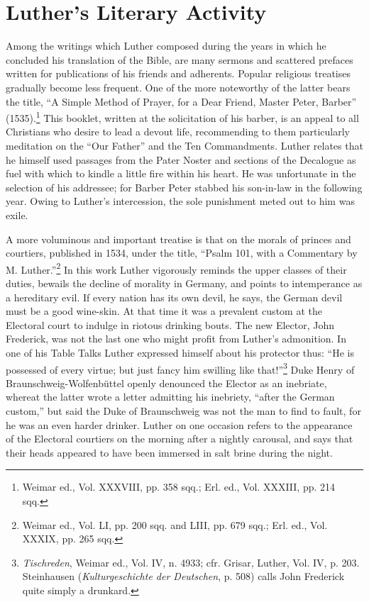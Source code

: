 \section{Luther’s Literary Activity}

Among the writings which Luther composed during the years in
which he concluded his translation of the Bible, are many sermons
and scattered prefaces written for publications of his friends and
adherents. Popular religious treatises gradually become less frequent.
One of the more noteworthy of the latter bears the title, “A Simple Method
of Prayer, for a Dear Friend, Master Peter, Barber”
(1535).\footnote{Weimar ed., Vol. XXXVIII, pp. 358 sqq.; Erl. ed., Vol. XXXIII, pp. 214 sqq.}
 This booklet, written at the solicitation of his barber, is an
appeal to all Christians who desire to lead a devout life, recommending
to them particularly meditation on the “Our Father” and the Ten
Commandments. Luther relates that he himself used passages from the
Pater Noster and sections of the Decalogue as fuel with which to
kindle a little fire within his heart. He was unfortunate in the selection
of his addressee; for Barber Peter stabbed his son-in-law in the
following year. Owing to Luther’s intercession, the sole punishment
meted out to him was exile.

A more voluminous and important treatise is that on the morals of
princes and courtiers, published in 1534, under the title, “Psalm 101,
with a Commentary by M. Luther.”\footnote
{Weimar ed., Vol. LI, pp. 200 sqq. and LIII, pp. 679 sqq.; Erl. ed., Vol. XXXIX, pp.
265 sqq.}
In this work Luther vigorously reminds
the upper classes of their duties, bewails the decline
of morality in Germany, and points to intemperance as a hereditary
evil. If every nation has its own devil, he says, the German devil must
be a good wine-skin. At that time it was a prevalent custom at the
Electoral court to indulge in riotous drinking bouts. The new Elector,
John Frederick, was not the last one who might profit from Luther’s
admonition. In one of his Table Talks Luther expressed himself about
his protector thus: “He is possessed of every virtue; but just fancy
him swilling like that!”\footnote
{\textit{Tischreden}, Weimar ed., Vol. IV, n. 4933; cfr. Grisar, Luther, Vol. IV, p. 203.
Steinhausen (\textit{Kulturgeschichte der Deutschen}, p. 508) calls John Frederick quite simply a
drunkard.}
Duke Henry of Braunschweig-Wolfenbüttel
openly denounced the Elector as an inebriate, whereat the latter
wrote a letter admitting his inebriety, ``after the German custom,''
but said the Duke of Braunschweig was not the man to find to fault,
for he was an even harder drinker. Luther on one occasion refers to the
appearance of the Electoral courtiers on the morning after a nightly
carousal, and says that their heads appeared to have been immersed in
salt brine during the night.

